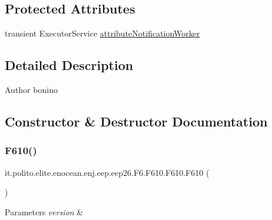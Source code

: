 \subsection*{Protected Attributes}
\begin{DoxyCompactItemize}
\item 
transient Executor\+Service \hyperlink{classit_1_1polito_1_1elite_1_1enocean_1_1enj_1_1eep_1_1eep26_1_1_f6_1_1_f610_1_1_f610_ab0636bd444a985722d72e90b9a06e836}{attribute\+Notification\+Worker}
\end{DoxyCompactItemize}


\subsection{Detailed Description}
\begin{DoxyAuthor}{Author}
bonino 
\end{DoxyAuthor}


\subsection{Constructor \& Destructor Documentation}
\hypertarget{classit_1_1polito_1_1elite_1_1enocean_1_1enj_1_1eep_1_1eep26_1_1_f6_1_1_f610_1_1_f610_a857ea579996963fa38d2b0d46c6c053a}{}\label{classit_1_1polito_1_1elite_1_1enocean_1_1enj_1_1eep_1_1eep26_1_1_f6_1_1_f610_1_1_f610_a857ea579996963fa38d2b0d46c6c053a} 
\subsubsection{\texorpdfstring{F610()}{F610()}}
{\footnotesize\ttfamily it.\+polito.\+elite.\+enocean.\+enj.\+eep.\+eep26.\+F6.\+F610.\+F610.\+F610 (\begin{DoxyParamCaption}{ }\end{DoxyParamCaption})}


\begin{DoxyParams}{Parameters}
{\em version} & \\
\hline
\end{DoxyParams}


